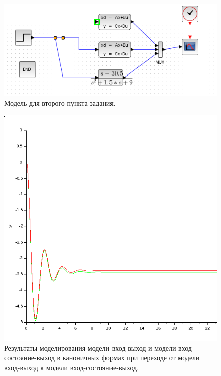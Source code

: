 \documentclass[12pt, a4paper] {ncc}
\begin{document}
	\begin{figure}[ht!]
		\includegraphics[scale=0.5]{./model2.png}
		\caption{Модель для второго пункта задания.}
	\end{figure}
	\begin{figure}[ht!]
		\includegraphics[scale=0.5]{./plot2.png}
		\caption{Результаты моделирования модели вход-выход и модели вход-состояние-выход в каноничных формах
			     при переходе от модели вход-выход к модели вход-состояние-выход.}
	\end{figure}
\end{document}
